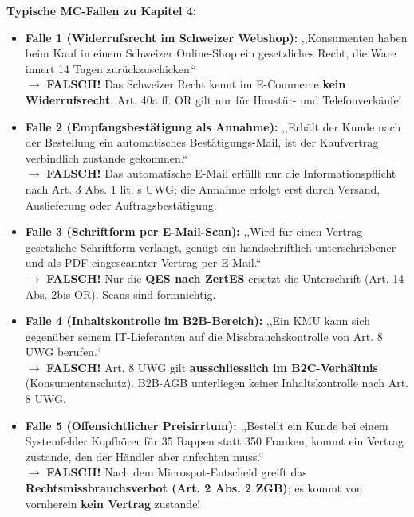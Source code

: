 \begin{important}
    \textbf{Typische MC-Fallen zu Kapitel 4:}
    \begin{itemize}
        \item \textbf{Falle 1 (Widerrufsrecht im Schweizer Webshop):} ,,Konsumenten haben beim Kauf in einem Schweizer Online-Shop ein gesetzliches Recht, die Ware innert 14 Tagen zurückzuschicken.`` \\
        $\rightarrow$ \textbf{FALSCH!} Das Schweizer Recht kennt im E-Commerce \textbf{kein Widerrufsrecht}. Art. 40a ff. OR gilt nur für Haustür- und Telefonverkäufe!
        \item \textbf{Falle 2 (Empfangsbestätigung als Annahme):} ,,Erhält der Kunde nach der Bestellung ein automatisches Bestätigungs-Mail, ist der Kaufvertrag verbindlich zustande gekommen.`` \\
        $\rightarrow$ \textbf{FALSCH!} Das automatische E-Mail erfüllt nur die Informationspflicht nach Art. 3 Abs. 1 lit. s UWG; die Annahme erfolgt erst durch Versand, Auslieferung oder Auftragsbestätigung.
        \item \textbf{Falle 3 (Schriftform per E-Mail-Scan):} ,,Wird für einen Vertrag gesetzliche Schriftform verlangt, genügt ein handschriftlich unterschriebener und als PDF eingescannter Vertrag per E-Mail.`` \\
        $\rightarrow$ \textbf{FALSCH!} Nur die \textbf{QES nach ZertES} ersetzt die Unterschrift (Art. 14 Abs. 2bis OR). Scans sind formnichtig.
        \item \textbf{Falle 4 (Inhaltskontrolle im B2B-Bereich):} ,,Ein KMU kann sich gegenüber seinem IT-Lieferanten auf die Missbrauchskontrolle von Art. 8 UWG berufen.`` \\
        $\rightarrow$ \textbf{FALSCH!} Art. 8 UWG gilt \textbf{ausschliesslich im B2C-Verhältnis} (Konsumentenschutz). B2B-AGB unterliegen keiner Inhaltskontrolle nach Art. 8 UWG.
        \item \textbf{Falle 5 (Offensichtlicher Preisirrtum):} ,,Bestellt ein Kunde bei einem Systemfehler Kopfhörer für 35 Rappen statt 350 Franken, kommt ein Vertrag zustande, den der Händler aber anfechten muss.`` \\
        $\rightarrow$ \textbf{FALSCH!} Nach dem Microspot-Entscheid greift das \textbf{Rechtsmissbrauchsverbot (Art. 2 Abs. 2 ZGB)}; es kommt von vornherein \textbf{kein Vertrag} zustande!
    \end{itemize}
\end{important}